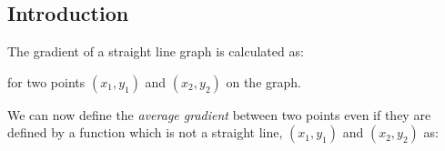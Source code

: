             \subsection{ Introduction}
            \nopagebreak
      \label{m39213*id189263}The gradient of a straight line graph is calculated as:\par 
      \label{m39213*uid1}\nopagebreak\noindent{}
      \label{m39213*id189656}for two points $\left({x}_{1},{y}_{1}\right)$ and \begin{math}\left({x}_{2},{y}_{2}\right)\end{math} on the graph.\par 
      \label{m39213*id189717}We can now define the \textsl{average gradient} between two points even if they are defined by a function which is not a straight line, $\left({x}_{1},{y}_{1}\right)$ and \begin{math}\left({x}_{2},{y}_{2}\right)\end{math} as:\par 
      \label{m39213*uid2}\nopagebreak\noindent{}
